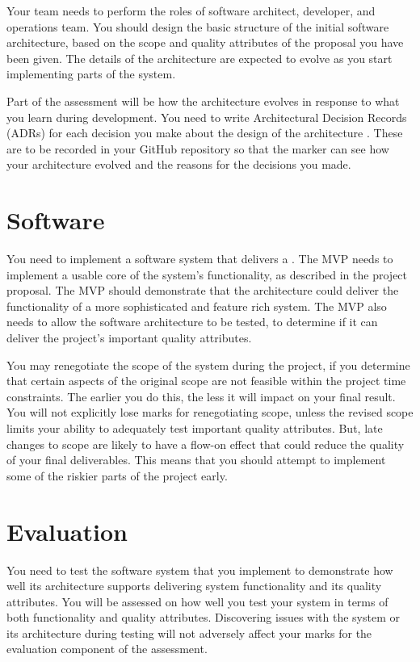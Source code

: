 \documentclass{csse4400}
\begin{document}

Your team needs to perform the roles of software architect, developer, and operations team.
You should design the basic structure of the initial software architecture,
based on the scope and quality attributes of the proposal you have been given.
The details of the architecture are expected to evolve as you start implementing parts of the system.

Part of the assessment will be how the architecture evolves in response to what you learn during development.
You need to write Architectural Decision Records (ADRs) for each decision you make about the design of the architecture \cite{adr-notes}.
These are to be recorded in your GitHub repository so that the marker can see how your architecture evolved and the reasons for the decisions you made.


\section{Software}
You need to implement a software system that delivers a
.
The MVP needs to implement a usable core of the system's functionality,
as described in the project proposal.
The MVP should demonstrate that the architecture could deliver the functionality of a more sophisticated and feature rich system.
The MVP also needs to allow the software architecture to be tested,
to determine if it can deliver the project's important quality attributes.

You may renegotiate the scope of the system during the project,
if you determine that certain aspects of the original scope are not feasible within the project time constraints.
The earlier you do this, the less it will impact on your final result.
You will not explicitly lose marks for renegotiating scope,
unless the revised scope limits your ability to adequately test important quality attributes.
But, late changes to scope are likely to have a flow-on effect that could reduce the quality of your final deliverables.
This means that you should attempt to implement some of the riskier parts of the project early.


\section{Evaluation}
You need to test the software system that you implement to demonstrate
how well its architecture supports delivering system functionality and its quality attributes.
You will be assessed on how well you test your system in terms of both functionality and quality attributes.
Discovering issues with the system or its architecture during testing will not adversely affect your marks for the evaluation component of the assessment.
\end{document}
